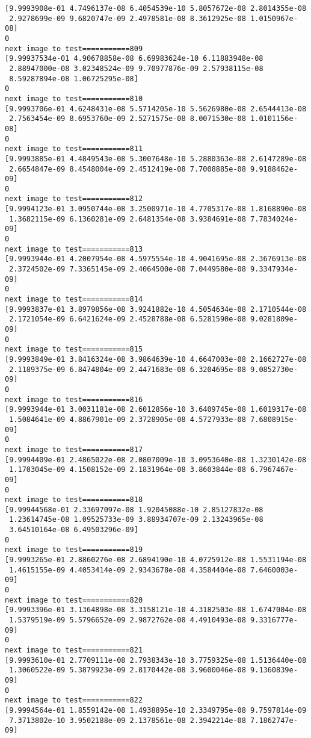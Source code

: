 \documentclass[11pt]{article}
\begin{document}
\begin{Verbatim}[commandchars=\\\{\}]
[9.9993908e-01 4.7496137e-08 6.4054539e-10 5.8057672e-08 2.8014355e-08
 2.9278699e-09 9.6820747e-09 2.4978581e-08 8.3612925e-08 1.0150967e-08]
0
next image to test===========809
[9.99937534e-01 4.90678858e-08 6.69983624e-10 6.11883948e-08
 2.88947000e-08 3.02348524e-09 9.70977876e-09 2.57938115e-08
 8.59287894e-08 1.06725295e-08]
0
next image to test===========810
[9.9993706e-01 4.6248431e-08 5.5714205e-10 5.5626980e-08 2.6544413e-08
 2.7563454e-09 8.6953760e-09 2.5271575e-08 8.0071530e-08 1.0101156e-08]
0
next image to test===========811
[9.9993885e-01 4.4849543e-08 5.3007648e-10 5.2880363e-08 2.6147289e-08
 2.6654847e-09 8.4548004e-09 2.4512419e-08 7.7008885e-08 9.9188462e-09]
0
next image to test===========812
[9.9994123e-01 3.0950744e-08 3.2500971e-10 4.7705317e-08 1.8168890e-08
 1.3682115e-09 6.1360281e-09 2.6481354e-08 3.9384691e-08 7.7834024e-09]
0
next image to test===========813
[9.9993944e-01 4.2007954e-08 4.5975554e-10 4.9041695e-08 2.3676913e-08
 2.3724502e-09 7.3365145e-09 2.4064500e-08 7.0449580e-08 9.3347934e-09]
0
next image to test===========814
[9.9993837e-01 3.8979856e-08 3.9241882e-10 4.5054634e-08 2.1710544e-08
 2.1721054e-09 6.6421624e-09 2.4528788e-08 6.5281590e-08 9.0281809e-09]
0
next image to test===========815
[9.9993849e-01 3.8416324e-08 3.9864639e-10 4.6647003e-08 2.1662727e-08
 2.1189375e-09 6.8474804e-09 2.4471683e-08 6.3204695e-08 9.0852730e-09]
0
next image to test===========816
[9.9993944e-01 3.0031181e-08 2.6012856e-10 3.6409745e-08 1.6019317e-08
 1.5084641e-09 4.8867901e-09 2.3728905e-08 4.5727933e-08 7.6808915e-09]
0
next image to test===========817
[9.9994409e-01 2.4865022e-08 2.0807009e-10 3.0953640e-08 1.3230142e-08
 1.1703045e-09 4.1508152e-09 2.1831964e-08 3.8603844e-08 6.7967467e-09]
0
next image to test===========818
[9.99944568e-01 2.33697097e-08 1.92045088e-10 2.85127832e-08
 1.23614745e-08 1.09525733e-09 3.88934707e-09 2.13243965e-08
 3.64510164e-08 6.49503296e-09]
0
next image to test===========819
[9.9993265e-01 2.8860276e-08 2.6894190e-10 4.0725912e-08 1.5531194e-08
 1.4615155e-09 4.4053414e-09 2.9343678e-08 4.3584404e-08 7.6460003e-09]
0
next image to test===========820
[9.9993396e-01 3.1364898e-08 3.3158121e-10 4.3182503e-08 1.6747004e-08
 1.5379519e-09 5.5796652e-09 2.9872762e-08 4.4910493e-08 9.3316777e-09]
0
next image to test===========821
[9.9993610e-01 2.7709111e-08 2.7938343e-10 3.7759325e-08 1.5136440e-08
 1.3060522e-09 5.3879923e-09 2.8170442e-08 3.9600046e-08 9.1360839e-09]
0
next image to test===========822
[9.9994564e-01 1.8559142e-08 1.4938895e-10 2.3349795e-08 9.7597814e-09
 7.3713802e-10 3.9502188e-09 2.1378561e-08 2.3942214e-08 7.1862747e-09]

\end{Verbatim}
\end{document}
